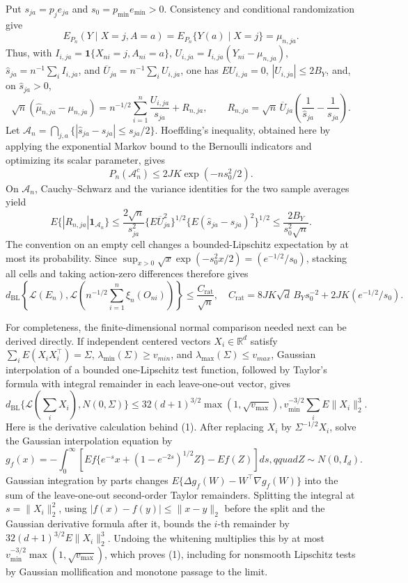 Put \(s_{ja}=p_je_{ja}\) and \(s_0=p_{\min}e_{\min}>0\).  Consistency and conditional randomization give
\[
 E_{P_n}(Y\mid X=j,A=a)=E_{P_n}\{Y(a)\mid X=j\}=\mu_{n,ja}.
\]
Thus, with \(I_{i,ja}=\mathbf 1\{X_{ni}=j,A_{ni}=a\}\), \(U_{i,ja}=I_{i,ja}(Y_{ni}-\mu_{n,ja})\), \(\widehat s_{ja}=n^{-1}\sum_iI_{i,ja}\), and \(\overline U_{ja}=n^{-1}\sum_iU_{i,ja}\), one has \(E U_{i,ja}=0\), \(|U_{i,ja}|\le2B_Y\), and, on \(\widehat s_{ja}>0\),
\[
 \sqrt n(\widehat\mu_{n,ja}-\mu_{n,ja})
 =n^{-1/2}\sum_{i=1}^n\frac{U_{i,ja}}{s_{ja}}
 +R_{n,ja},\qquad
 R_{n,ja}=\sqrt n\,\overline U_{ja}
       \left(\frac1{\widehat s_{ja}}-\frac1{s_{ja}}\right).
\]
Let \(\mathcal A_n=\bigcap_{j,a}\{|\widehat s_{ja}-s_{ja}|\le s_{ja}/2\}\).  Hoeffding's inequality, obtained here by applying the exponential Markov bound to the Bernoulli indicators and optimizing its scalar parameter, gives
\[
 P_n(\mathcal A_n^c)\le2JK\exp(-ns_0^2/2).
\]
On \(\mathcal A_n\), Cauchy--Schwarz and the variance identities for the two sample averages yield
\[
 E\{|R_{n,ja}|\mathbf1_{\mathcal A_n}\}
 \le \frac{2\sqrt n}{s_{ja}^2}
       \{E\overline U_{ja}^2\}^{1/2}
       \{E(\widehat s_{ja}-s_{ja})^2\}^{1/2}
 \le \frac{2B_Y}{s_0^2\sqrt n}.
\]
The convention on an empty cell changes a bounded-Lipschitz expectation by at most its probability.  Since \(\sup_{x>0}\sqrt{x}\exp(-s_0^2x/2)=(e^{-1/2}/s_0)\), stacking all cells and taking action-zero differences therefore gives
\[
 d_{\mathrm{BL}}\!\left\{\mathcal L(E_n),
 \mathcal L\!\left(n^{-1/2}\sum_{i=1}^n\xi_n(O_{ni})\right)\right\}
 \le \frac{C_{\mathrm{rat}}}{\sqrt n},
 \quad
 C_{\mathrm{rat}}=8JK\sqrt d\,B_Ys_0^{-2}+2JK(e^{-1/2}/s_0).
\]

For completeness, the finite-dimensional normal comparison needed next can be derived directly.  If independent centered vectors \(X_i\in\mathbb R^d\) satisfy \(\sum_iE(X_iX_i^\top)=\Sigma\), \(\lambda_{\min}(\Sigma)\ge v_{min}\), and \(\lambda_{\max}(\Sigma)\le v_{max}\), Gaussian interpolation of a bounded one-Lipschitz test function, followed by Taylor's formula with integral remainder in each leave-one-out vector, gives
\[
 d_{\mathrm{BL}}\{\mathcal L(\textstyle\sum_iX_i),N(0,\Sigma)\}
 \le 32(d+1)^{3/2}\max(1,\sqrt{v_{\max}}),v_{\min}^{-3/2}
       \sum_iE\|X_i\|_2^3.                                           \tag{1}
\]
Here is the derivative calculation behind (1).  After replacing \(X_i\) by \(\Sigma^{-1/2}X_i\), solve the Gaussian interpolation equation by
\[
 g_f(x)=-\int_0^\infty
 \left[E f\{e^{-s}x+(1-e^{-2s})^{1/2}Z\}-Ef(Z)\right]ds,qquad Z\sim N(0,I_d).
\]
Gaussian integration by parts changes \(E\{\Delta g_f(W)-W^\top\nabla g_f(W)\}\) into the sum of the leave-one-out second-order Taylor remainders.  Splitting the integral at \(s=\|X_i\|_2^2\), using \(|f(x)-f(y)|\le\|x-y\|_2\) before the split and the Gaussian derivative formula after it, bounds the \(i\)-th remainder by \(32(d+1)^{3/2}E\|X_i\|_2^3\).  Undoing the whitening multiplies this by at most \(v_{\min}^{-3/2}\max(1,\sqrt{v_{\max}})\), which proves (1), including for nonsmooth Lipschitz tests by Gaussian mollification and monotone passage to the limit.

